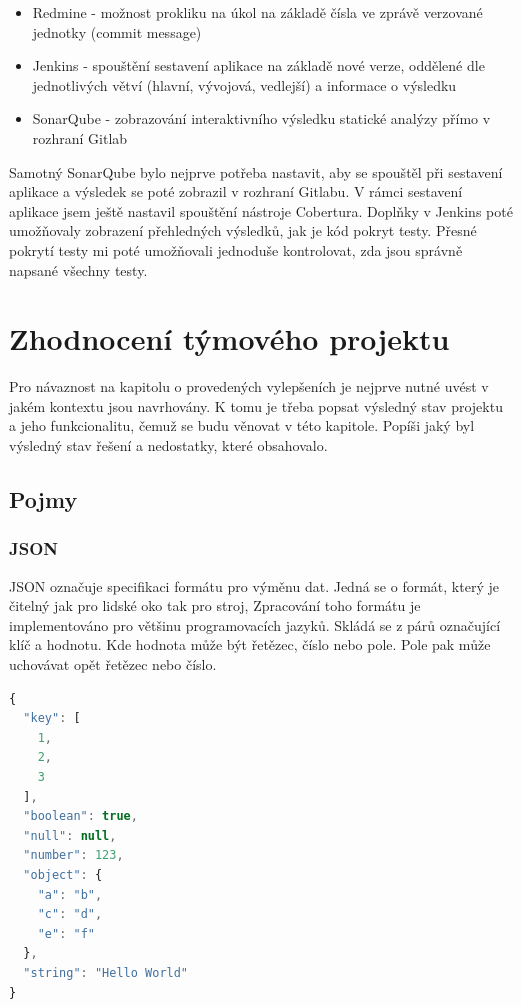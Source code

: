 \documentclass[thesis=B,czech]{FITthesis}[2012/06/26]
\begin{document}
\begin{itemize}
\item Redmine - možnost prokliku na úkol na základě čísla ve zprávě verzované jednotky (commit message)
\item Jenkins - spouštění sestavení aplikace na základě nové verze, oddělené dle jednotlivých větví (hlavní, vývojová, vedlejší) a
				informace o výsledku
\item SonarQube - zobrazování interaktivního výsledku statické analýzy přímo v rozhraní Gitlab
\end{itemize}

Samotný SonarQube bylo nejprve potřeba nastavit, aby se spouštěl při sestavení aplikace a výsledek se poté zobrazil v rozhraní
Gitlabu. V rámci sestavení aplikace jsem ještě nastavil spouštění nástroje Cobertura.
Doplňky v Jenkins poté umožňovaly zobrazení přehledných výsledků, jak je kód pokryt testy. Přesné pokrytí testy mi poté umožňovali 
jednoduše kontrolovat, zda jsou správně napsané všechny testy.


\chapter{Zhodnocení týmového projektu}
Pro návaznost na kapitolu o provedených vylepšeních je nejprve nutné uvést v jakém kontextu jsou navrhovány. K tomu je třeba
popsat výsledný stav projektu a jeho funkcionalitu, čemuž se budu věnovat v této kapitole. Popíši jaký byl výsledný stav
řešení a nedostatky, které obsahovalo.

\section{Pojmy}

\subsection{JSON}
JSON označuje specifikaci formátu pro výměnu dat\cite{JSON}. Jedná se o formát, který je čitelný jak pro lidské oko tak pro stroj\cite{JSON},
Zpracování toho formátu je implementováno pro většinu programovacích jazyků\cite{JSON-impl}. Skládá se z párů označující
klíč a hodnotu. Kde hodnota může být řetězec, číslo nebo pole. Pole pak může uchovávat opět řetězec nebo číslo. \cite{JSON}

\begin{lstlisting}[language=JavaScript, caption={Ukázka formátu JSON}]
{
  "key": [
    1,
    2,
    3
  ],
  "boolean": true,
  "null": null,
  "number": 123,
  "object": {
    "a": "b",
    "c": "d",
    "e": "f"
  },
  "string": "Hello World"
}
\end{lstlisting}
\end{document}
